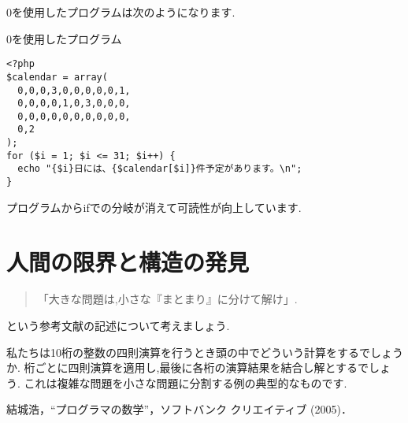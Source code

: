 \documentclass[10pt, twocolumn]{jarticle}
\begin{document}
0を使用したプログラムは次のようになります.

\begin{itembox}[l]{0を使用したプログラム}
\begin{verbatim}
<?php
$calendar = array(
  0,0,0,3,0,0,0,0,0,1,
  0,0,0,0,1,0,3,0,0,0,
  0,0,0,0,0,0,0,0,0,0,
  0,2
);
for ($i = 1; $i <= 31; $i++) {
  echo "{$i}日には、{$calendar[$i]}件予定があります。\n";
}
\end{verbatim}
\end{itembox}

プログラムからifでの分岐が消えて可読性が向上しています.

\section{人間の限界と構造の発見}


\begin{quote}
「大きな問題は,小さな『まとまり』に分けて解け」.
\end{quote}
という参考文献の記述について考えましょう.

私たちは10桁の整数の四則演算を行うとき頭の中でどういう計算をするでしょうか.
桁ごとに四則演算を適用し,最後に各桁の演算結果を結合し解とするでしょう.
これは複雑な問題を小さな問題に分割する例の典型的なものです.

\begin{thebibliography}{9}
     結城浩，“プログラマの数学”，ソフトバンク クリエイティブ (2005)．
\end{thebibliography}
\end{document}
